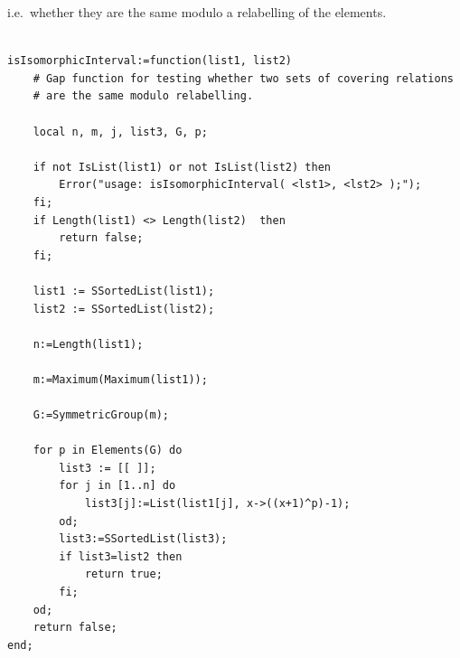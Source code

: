i.e.~whether they are the same modulo a relabelling of the elements.
{\codesize
\begin{verbatim}

isIsomorphicInterval:=function(list1, list2)
    # Gap function for testing whether two sets of covering relations 
    # are the same modulo relabelling. 
    
    local n, m, j, list3, G, p;
    
    if not IsList(list1) or not IsList(list2) then
        Error("usage: isIsomorphicInterval( <lst1>, <lst2> );");
    fi;
    if Length(list1) <> Length(list2)  then
        return false;
    fi;
        
    list1 := SSortedList(list1);
    list2 := SSortedList(list2);

    n:=Length(list1);
    
    m:=Maximum(Maximum(list1));
  
    G:=SymmetricGroup(m);
    
    for p in Elements(G) do
        list3 := [[ ]];
        for j in [1..n] do
            list3[j]:=List(list1[j], x->((x+1)^p)-1); 
        od;
        list3:=SSortedList(list3);
        if list3=list2 then
            return true;
        fi;
    od;
    return false;
end;

\end{verbatim}}
